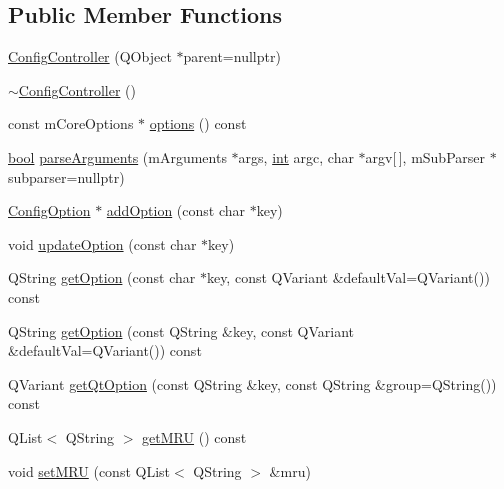 \subsection*{Public Member Functions}
\begin{DoxyCompactItemize}
\item 
\mbox{\hyperlink{class_q_g_b_a_1_1_config_controller_af8c155ead641303df8388286d9cdf494}{Config\+Controller}} (Q\+Object $\ast$parent=nullptr)
\item 
\mbox{\hyperlink{class_q_g_b_a_1_1_config_controller_adf8d1c79773c708fe1e61d0047e0526d}{$\sim$\+Config\+Controller}} ()
\item 
const m\+Core\+Options $\ast$ \mbox{\hyperlink{class_q_g_b_a_1_1_config_controller_a5935ec3402096eb3a4629a72a9872b03}{options}} () const
\item 
\mbox{\hyperlink{libretro_8h_a4a26dcae73fb7e1528214a068aca317e}{bool}} \mbox{\hyperlink{class_q_g_b_a_1_1_config_controller_a5a1bc56dda151c14559105f1da5af88b}{parse\+Arguments}} (m\+Arguments $\ast$args, \mbox{\hyperlink{ioapi_8h_a787fa3cf048117ba7123753c1e74fcd6}{int}} argc, char $\ast$argv\mbox{[}$\,$\mbox{]}, m\+Sub\+Parser $\ast$subparser=nullptr)
\item 
\mbox{\hyperlink{class_q_g_b_a_1_1_config_option}{Config\+Option}} $\ast$ \mbox{\hyperlink{class_q_g_b_a_1_1_config_controller_a2fead7b5d6810384e6779ab58af9101f}{add\+Option}} (const char $\ast$key)
\item 
void \mbox{\hyperlink{class_q_g_b_a_1_1_config_controller_a059a8c29f3461330f6118749f6115e71}{update\+Option}} (const char $\ast$key)
\item 
Q\+String \mbox{\hyperlink{class_q_g_b_a_1_1_config_controller_a9c0190d19267446ec9959084664fb1a2}{get\+Option}} (const char $\ast$key, const Q\+Variant \&default\+Val=Q\+Variant()) const
\item 
Q\+String \mbox{\hyperlink{class_q_g_b_a_1_1_config_controller_a896df6163b258ee10856c3c7c5272fd7}{get\+Option}} (const Q\+String \&key, const Q\+Variant \&default\+Val=Q\+Variant()) const
\item 
Q\+Variant \mbox{\hyperlink{class_q_g_b_a_1_1_config_controller_abc071c2df876fa323690827538b83756}{get\+Qt\+Option}} (const Q\+String \&key, const Q\+String \&group=Q\+String()) const
\item 
Q\+List$<$ Q\+String $>$ \mbox{\hyperlink{class_q_g_b_a_1_1_config_controller_a27200ffdc0e855790c1f13196c8990ef}{get\+M\+RU}} () const
\item 
void \mbox{\hyperlink{class_q_g_b_a_1_1_config_controller_ae8779e0933a56b6b08cf368660432ac1}{set\+M\+RU}} (const Q\+List$<$ Q\+String $>$ \&mru)

\end{DoxyCompactItemize}
